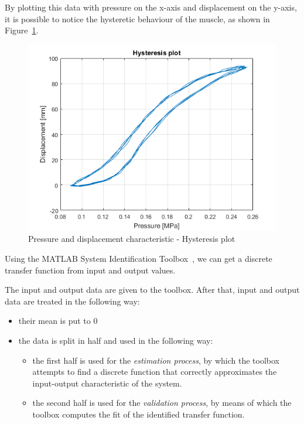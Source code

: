 By plotting this data with pressure on the x-axis and displacement on the y-axis,
it is possible to notice the hysteretic behaviour of the muscle,
as shown in Figure~\ref{fig:hysteresis_plot}.

\begin{figure}[]
	\centering
	\includegraphics[width=\linewidth]{"Images/hysteresis_plot"}
	\caption[Pressure and displacement characteristic]{Pressure and displacement characteristic - Hysteresis plot}
	\label{fig:hysteresis_plot}
\end{figure}

Using the MATLAB System Identification Toolbox~\cite{ide_toolbox},
we can get a discrete transfer function from input and output values.

The input and output data are given to the toolbox. 
After that, input and output data are treated in the following way:
\begin{itemize}
	\item their mean is put to 0
	\item the data is split in half and used in the following way:
	\begin{itemize}
		\item the first half is used for the \textit{estimation process},
		by which the toolbox attempts to find a discrete function
		that correctly approximates the input-output characteristic of the system.
		\item the second half is used for the \textit{validation process},
		by means of which the toolbox computes the fit of the identified transfer function.
	\end{itemize}
\end{itemize}  


